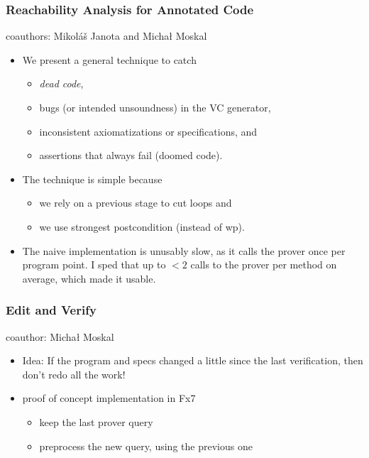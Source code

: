 \documentclass{beamer}
\begin{document}
\begin{frame}
  \frametitle{Reachability Analysis for Annotated Code}
  coauthors: Mikol\'a\v{s} Janota and Micha{\l} Moskal\bigskip
  \begin{itemize}
  \item We present a general technique to catch
    \begin{itemize}
    \item \emph{dead code},
    \item bugs (or intended unsoundness) in the VC generator,
    \item inconsistent axiomatizations or specifications, and
    \item assertions that always fail (doomed code).
    \end{itemize}
  \item The technique is simple because
    \begin{itemize}
    \item we rely on a previous stage to cut loops and
    \item we use strongest postcondition (instead of wp).
    \end{itemize}
  \item The naive implementation is unusably slow, as it calls
    the prover once per program point. I sped that up to $<2$
    calls to the prover per method on average, which made it 
    usable.
  \end{itemize}
\end{frame}

\begin{frame}
  \frametitle{Edit and Verify}
  coauthor: Micha{\l} Moskal\bigskip
  \begin{itemize}
  \item Idea: If the program and specs changed a little since
    the last verification, then don't redo all the work!
  \item proof of concept implementation in Fx7
    \begin{itemize}
    \item keep the last prover query
    \item preprocess the new query, using the previous one
    \end{itemize}
  \end{itemize}
\end{frame}
\end{document}
